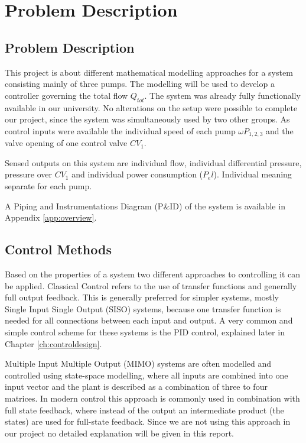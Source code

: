 \chapter{Problem Description}\label{ch:probdesc}

\section{Problem Description}
This project is about different mathematical modelling approaches for a system consisting mainly of three pumps.
The modelling will be used to develop a controller governing the total flow $Q_{tot}$.
The system was already fully functionally available in our university.
No alterations on the setup were possible to complete our project,
since the system was simultaneously used by two other groups.
As control inputs were available the individual speed of each pump $\omega P_{1,2,3}$ and the valve opening of one control valve $CV_1$.

Sensed outputs on this system are individual flow, individual differential pressure, pressure over $CV_1$ and individual power consumption ($P_el$).
Individual meaning separate for each pump.

A Piping and Instrumentations Diagram (P\&ID) of the system is available in Appendix \ref{app:overview}.


\section{Control Methods}
Based on the properties of a system two different approaches to controlling it can be applied.
Classical Control refers to the use of transfer functions
and generally full output feedback.
This is generally preferred for simpler systems,
mostly Single Input Single Output (SISO) systems,
because one transfer function is needed for all connections between each input and output.
A very common and simple control scheme for these systems is the PID control,
explained later in Chapter \ref{ch:controldesign}.
\cite{Franklin2014}

Multiple Input Multiple Output (MIMO) systems are often modelled and controlled using state-space
modelling, where all inputs are combined into one input vector
and the plant is described as a combination of three to four matrices.
In modern control this approach is commonly used in combination with full state feedback,
where instead of the output an intermediate product (the states) are used for full-state feedback.
Since we are not using this approach in our project no detailed explanation will be given in this report.


